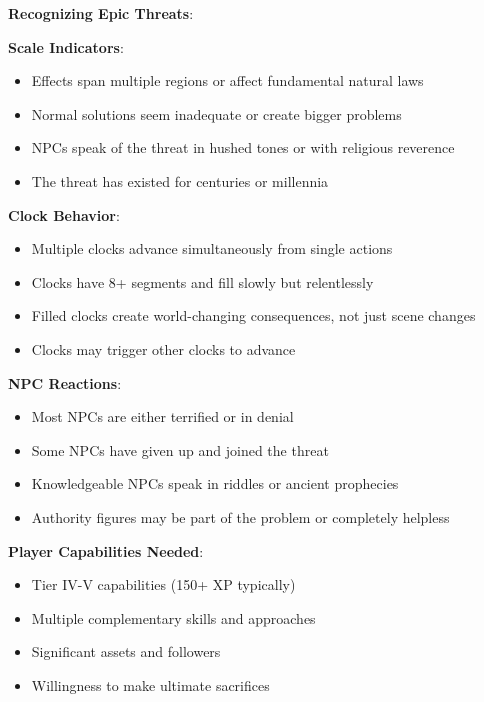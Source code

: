 \documentclass[11pt]{article}
\begin{document}
\begin{mdframed}[backgroundcolor=mechanicbg]
\textbf{Recognizing Epic Threats}:

\textbf{Scale Indicators}:
\begin{itemize}[leftmargin=*]
\item Effects span multiple regions or affect fundamental natural laws
\item Normal solutions seem inadequate or create bigger problems
\item NPCs speak of the threat in hushed tones or with religious reverence
\item The threat has existed for centuries or millennia
\end{itemize}

\textbf{Clock Behavior}:
\begin{itemize}[leftmargin=*]
\item Multiple clocks advance simultaneously from single actions
\item Clocks have 8+ segments and fill slowly but relentlessly
\item Filled clocks create world-changing consequences, not just scene changes
\item Clocks may trigger other clocks to advance
\end{itemize}

\textbf{NPC Reactions}:
\begin{itemize}[leftmargin=*]
\item Most NPCs are either terrified or in denial
\item Some NPCs have given up and joined the threat
\item Knowledgeable NPCs speak in riddles or ancient prophecies
\item Authority figures may be part of the problem or completely helpless
\end{itemize}

\textbf{Player Capabilities Needed}:
\begin{itemize}[leftmargin=*]
\item Tier IV-V capabilities (150+ XP typically)
\item Multiple complementary skills and approaches
\item Significant assets and followers
\item Willingness to make ultimate sacrifices
\end{itemize}
\end{mdframed}
\end{document}

